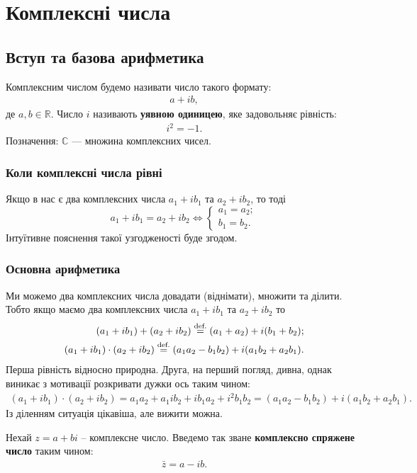\documentclass{math_library}
\begin{document}
\tableofcontents
\newpage
	
\section{Комплексні числа}
\subsection{Вступ та базова арифметика}
Комплексним числом будемо називати число такого формату:
\begin{align*}
a + ib,
\end{align*}
де $a,b \in \mathbb{R}$. Число $i$ називають \textbf{уявною одиницею}, яке задовольняє рівність:
\begin{align*}
i^2 = -1.
\end{align*}
Позначення: $\mathbb{C}$ --- множина комплексних чисел.

\subsubsection*{Коли комплексні числа рівні}
Якщо в нас є два комплексних числа $a_1 + ib_1$ та $a_2 + ib_2$, то тоді
\[
a_1 + ib_1 = a_2 + ib_2 \iff 
\begin{cases} a_1 = a_2; \\ b_1 = b_2. \end{cases}
\]
Інтуїтивне пояснення такої узгодженості буде згодом.

\subsubsection*{Основна арифметика}
Ми можемо два комплексних числа довадати (віднімати), множити та ділити. Тобто якщо маємо два комплексних числа $a_1 + ib_1$ та $a_2 + ib_2$ то
\begin{align*}
(a_1 + i b_1) + (a_2 + ib_2) \overset{\text{def.}}{=} (a_1 + a_2) + i (b_1 + b_2); \\
(a_1+ib_1) \cdot (a_2 + ib_2) \overset{\text{def.}}{=} (a_1a_2-b_1b_2) + i(a_1b_2+a_2b_1).
\end{align*}
Перша рівність відносно природна. Друга, на перший погляд, дивна, однак виникає з мотивації розкривати дужки ось таким чином:
\begin{align*}
(a_1+ib_1) \cdot (a_2 + ib_2) = a_1 a_2 + a_1 i b_2 + ib_1 a_2 + i^2 b_1 b_2 = (a_1a_2-b_1b_2) + i(a_1b_2+a_2b_1).
\end{align*}
Із діленням ситуація цікавіша, але вижити можна.
\begin{definition}
Нехай $z = a+bi$ -- комплексне число. Введемо так зване \textbf{комплексно спряжене число} таким чином:
\begin{align*}
\bar{z} = a - ib.
\end{align*}
\end{definition}
\end{document}
